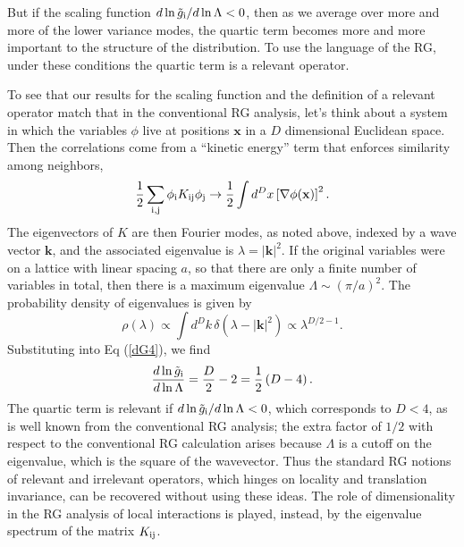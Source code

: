 \documentclass[aps,twocolumn,floats,nofootinbib,prl]{revtex4}
\begin{document}
But if the scaling function ${d\ln \tilde g_{\rm i} }/{d\ln\Lambda} < 0$, then as we average over more and more of the lower variance modes, the quartic term becomes more and more important to the structure of the distribution.    To use the language of the RG, under these conditions the quartic term is a relevant operator.  

To see that  our results for the scaling function and the definition of a relevant operator match that in the conventional RG analysis, let's think about a system in which the variables $\phi$ live at positions $\mathbf x$ in a $D$ dimensional Euclidean space.  Then the correlations come from a  ``kinetic energy'' term that enforces similarity among neighbors, 
\begin{equation}
 \frac{1}{2}\sum_{{\rm i},{\rm j}} \phi_{\rm i} K_{\rm ij} \phi_{\rm j}  \rightarrow \frac{1}{2}\int d^D x \left[ {\mathbf\nabla} \phi({\mathbf x}) \right]^2 .
\end{equation}
The eigenvectors of $K$ are then Fourier modes, as noted above, indexed by a wave vector $\mathbf k$, and the associated eigenvalue is $\lambda = |\mathbf k|^2$.  If the original variables were on a lattice with linear spacing $a$, so that there are only a finite number of variables in total, then there is a maximum eigenvalue $\Lambda \sim (\pi/a)^2$.  The probability density of eigenvalues is given by
\begin{equation}
\rho(\lambda ) \propto \int d^D k \,\delta\left( \lambda - |\mathbf k|^2 \right) \propto \lambda^{{D/2}-1} .
\end{equation}
Substituting into Eq (\ref{dG4}), we find 
\begin{equation}
\frac{d\ln \tilde g_{\rm i} }{d\ln\Lambda} =  \frac{D}{2} - 2 = \frac{1}{2}\left( D - 4\right).
\end{equation}
The quartic term is relevant if ${d\ln \tilde g_{\rm i} }/{d\ln\Lambda} < 0$, which corresponds to $D < 4$, as is well known from the conventional RG analysis; the extra factor of $1/2$ with respect to the conventional RG calculation arises because $\Lambda$ is a cutoff on the eigenvalue, which is the square of the wavevector.
Thus the standard RG notions of relevant and irrelevant operators, which hinges on locality and translation invariance, can be recovered without using these ideas.  The role of dimensionality in the RG analysis of local interactions is played, instead, by the eigenvalue spectrum of the matrix $K_{\rm ij}$.
\end{document}
